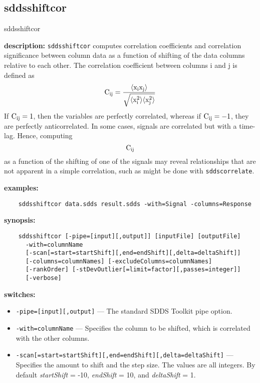 \newpage
\subsection{sddsshiftcor}
\label{sddsshiftcor}

\begin{sddsprog}{sddsshiftcor}
  \item \textbf{description:} \verb|sddsshiftcor| computes correlation coefficients and correlation significance between column data as a function of shifting of the data columns relative to each other. The correlation coefficient between columns i and j is defined as
  \[
  {\rm C_{ij} = \frac{\langle x_i x_j \rangle}{\sqrt{\langle x_i^2\rangle\langle x_j^2 \rangle}}}
  \]
  If ${\rm C_{ij}=1}$, then the variables are perfectly correlated, whereas if ${\rm C_{ij}=-1}$, they are perfectly anticorrelated. In some cases, signals are correlated but with a time-lag. Hence, computing \[ {\rm C_{ij}} \] as a function of the shifting of one of the signals may reveal relationships that are not apparent in a simple correlation, such as might be done with \verb|sddscorrelate|.
  \item \textbf{examples:}
    \begin{verbatim}
    sddsshiftcor data.sdds result.sdds -with=Signal -columns=Response
    \end{verbatim}
  \item \textbf{synopsis:}
    \begin{verbatim}
    sddsshiftcor [-pipe=[input][,output]] [inputFile] [outputFile]
      -with=columnName
      [-scan[=start=startShift][,end=endShift][,delta=deltaShift]]
      [-columns=columnNames] [-excludeColumns=columnNames]
      [-rankOrder] [-stDevOutlier[=limit=factor][,passes=integer]]
      [-verbose]
    \end{verbatim}
  \item \textbf{switches:}
    \begin{itemize}
      \item \verb|-pipe=[input][,output]| --- The standard SDDS Toolkit pipe option.
      \item \verb|-with=columnName| --- Specifies the column to be shifted, which is correlated with the other columns.
      \item \verb|-scan[=start=startShift][,end=endShift][,delta=deltaShift]| --- Specifies the amount to shift and the step size. The values are all integers. By default \emph{startShift} = -10, \emph{endShift} = 10, and \emph{deltaShift} = 1.

\end{itemize}
\end{sddsprog}
